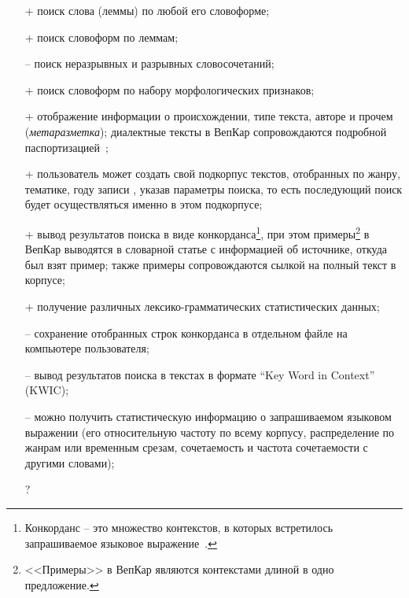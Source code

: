 \begin{itemize}
    \item[+] поиск слова (леммы) по любой его словоформе;
    \item[+] поиск словоформ по леммам;
    \item[--] поиск неразрывных и разрывных словосочетаний;
    \item[+] поиск словоформ по набору морфологических признаков;
    \item[+] отображение информации о происхождении, типе текста, авторе и прочем (\emph{метаразметка}); 
        диалектные тексты в ВепКар сопровождаются подробной паспортизацией~\cite{Krizhanovsky2019Architecture};
    \item[+] пользователь может создать свой подкорпус текстов, 
        отобранных по жанру, тематике, году записи , 
        указав параметры поиска, 
        то есть последующий поиск будет осуществляться именно в этом подкорпусе;
    
    \item[+] вывод результатов поиска в виде конкорданса\footnote{
            Конкорданс -- это множество контекстов, 
            в которых встретилось запрашиваемое языковое выражение~\cite[с.~415]{Kibrik2019}.
        }, при этом примеры\footnote{<<Примеры>> 
                                        в ВепКар являются контекстами 
                                        длиной в одно предложение.} 
                в ВепКар выводятся в словарной статье с информацией об источнике, откуда был взят пример; 
                также примеры сопровождаются сылкой на полный текст в корпусе;
    \item[+] получение различных лексико-грамматических статистических данных;
    \item[--] сохранение отобранных строк конкорданса в отдельном файле на компьютере пользователя;
    \item[--] вывод результатов поиска в текстах в формате ``Key Word in Context'' (KWIC);
    \item[--] можно получить статистическую информацию 
        о запрашиваемом языковом выражении (его относительную частоту по всему корпусу,
        распределение по жанрам или временным срезам, сочетаемость и частота сочетаемости с другими словами);
        
    \item[?] 
\end{itemize}
